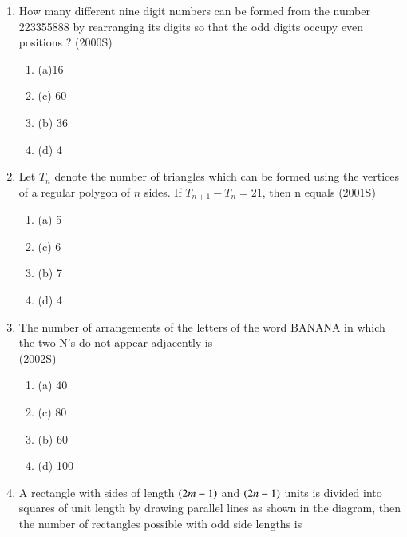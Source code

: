 \documentclass[journal,12pt,twocolumn]{IEEEtran}
\theoremstyle{remark}
\begin{document}
\begin{enumerate}[start=3]
\begin{multicols}{2}
\begin{enumerate}
\item (a) $216$\item (c) 600\item(b) $240$\item (d) 3125\\[4pt]
\end{enumerate}
\end{multicols}
\item How many different nine digit numbers can be formed from the number 223355888 by rearranging its digits so that the odd digits occupy even positions ?
\hfill{(2000S)}\\
\begin{multicols}{2} 
\begin{enumerate}
[label=, left=0pt, labelsep=0pt, itemsep=1em]
\item(a)16 \item (c) 60\item(b) 36\item(d) 4
\end{enumerate}
\end{multicols}
\item Let $T_n$ denote the number of triangles which can be formed using the vertices of a regular polygon of $n$ sides. If $T_{n+1}-T_n=21$, then n equals
\hfill{(2001S)}\\
\begin{multicols}{2} 
\begin{enumerate}
[label=, left=0pt, labelsep=0pt, itemsep=1em]
\item(a) 5\item(c) 6\item (b) 7\item (d) 4
\end{enumerate}
\end{multicols}
\item The number of arrangements of the letters of the word BANANA in which the two N's do not appear adjacently is\\
\hfill{(2002S)}
\begin{multicols}{2} 
\begin{enumerate}
[label=, left=0pt, labelsep=0pt, itemsep=1em]
\item (a) 40\item(c) 80\item (b) 60\item (d) 100
\end{enumerate}
\end{multicols}
\item A rectangle with sides of length $\left(2m-1\right)$ and $\left(2n-1\right)$ units is divided into squares of unit length by drawing parallel lines as shown in the diagram, then the number of rectangles possible with odd side lengths is\\

\end{enumerate}
\end{document}
